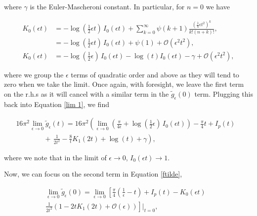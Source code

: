 \documentclass{article}
\numberwithin{equation}{section} %
\begin{document}
\noindent where $\gamma$ is the Euler-Mascheroni constant\cite{euler-mascheroni}. In particular, for $n=0$ we have

\begin{equation}
\begin{split}
K_0(\epsilon t) &= -\log(\frac{1}{2}\epsilon t)\, I_0(\epsilon t) 
+ \sum^\infty_{k=0}\psi(k+1)\frac{(\frac{1}{4}\epsilon t^2)^k}{k!(n+k)!},\\
&= -\log(\frac{1}{2}\epsilon t)\, I_0(\epsilon t) +  \psi(1) + \mathcal{O}(\epsilon^2t^2),\\
K_0(\epsilon t)&= -\log(\frac{1}{2}\epsilon)\, I_0(\epsilon t) - \log(t)I_0(\epsilon t) - \gamma + \mathcal{O}(\epsilon^2t^2),
\end{split}
\end{equation}

\noindent where we group the $\epsilon$ terms of quadratic order and above as they will tend to zero when we take the limit. Once again, with foresight, we leave the first term on the r.h.s as it will cancel with a similar term in the $\tilde{g}_\epsilon(0)$ term. Plugging this back into Equation \ref{lim 1}, we find

\begin{equation}
\begin{split}
16\pi^2 \lim_{\epsilon\rightarrow 0} \tilde{g}_\epsilon(t) = 16\pi^2 \left( \lim_{\epsilon\rightarrow 0} \left( \frac{\pi}{4\epsilon} +\log(\frac{1}{2}\epsilon)\, I_0(\epsilon t)\right) - \frac{\pi}{4} t + I_p(t)  \right. &\\
 \left. \quad \quad \quad \quad + \, \frac{1}{2t^2} - \frac{8}{t}K_1(2t) + \log(t) + \gamma \right),&
\end{split}
\label{lim 11}
\end{equation}

\noindent where we note that in the limit of $\epsilon\rightarrow 0$, $I_0(\epsilon t) \rightarrow 1$.

Now, we can focus on the second term in Equation \ref{ftilde},

\begin{equation*}
\begin{split}
\lim_{\epsilon \rightarrow 0}\tilde{g}_\epsilon(0) = \lim_{\epsilon \rightarrow 0} \left[\frac{\pi}{4}\left( \frac{1}{\epsilon} - t\right) + I_p(t) - K_0(\epsilon t) \right. &\\
 \left. \frac{1}{2t^2} \left( 1 - 2tK_1(2t) + \mathcal{O}(\epsilon)\right) \right]\bigg\vert_{t=0},& 
\end{split}
\end{equation*}
\end{document}
